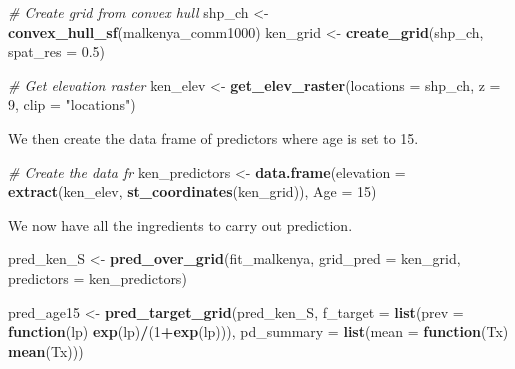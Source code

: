 \documentclass[
  letterpaper,
]{krantz}
\newenvironment{Shaded}{\begin{snugshade}}{\end{snugshade}}
\newcommand{\AttributeTok}[1]{\textcolor[rgb]{0.13,0.29,0.53}{#1}}
\newcommand{\CommentTok}[1]{\textcolor[rgb]{0.56,0.35,0.01}{\textit{#1}}}
\newcommand{\ControlFlowTok}[1]{\textcolor[rgb]{0.13,0.29,0.53}{\textbf{#1}}}
\newcommand{\DecValTok}[1]{\textcolor[rgb]{0.00,0.00,0.81}{#1}}
\newcommand{\FloatTok}[1]{\textcolor[rgb]{0.00,0.00,0.81}{#1}}
\newcommand{\FunctionTok}[1]{\textcolor[rgb]{0.13,0.29,0.53}{\textbf{#1}}}
\newcommand{\NormalTok}[1]{#1}
\newcommand{\OtherTok}[1]{\textcolor[rgb]{0.56,0.35,0.01}{#1}}
\newcommand{\SpecialCharTok}[1]{\textcolor[rgb]{0.81,0.36,0.00}{\textbf{#1}}}
\newcommand{\StringTok}[1]{\textcolor[rgb]{0.31,0.60,0.02}{#1}}
\begin{document}
\begin{Shaded}
\begin{Highlighting}[]
\CommentTok{\# Create grid from convex hull}
\NormalTok{shp\_ch }\OtherTok{\textless{}{-}} \FunctionTok{convex\_hull\_sf}\NormalTok{(malkenya\_comm1000)}
\NormalTok{ken\_grid }\OtherTok{\textless{}{-}} \FunctionTok{create\_grid}\NormalTok{(shp\_ch, }\AttributeTok{spat\_res =} \FloatTok{0.5}\NormalTok{)}

\CommentTok{\# Get elevation raster}
\NormalTok{ken\_elev }\OtherTok{\textless{}{-}} 
\FunctionTok{get\_elev\_raster}\NormalTok{(}\AttributeTok{locations =}\NormalTok{ shp\_ch, }
                \AttributeTok{z =} \DecValTok{9}\NormalTok{, }\AttributeTok{clip =} \StringTok{"locations"}\NormalTok{)}
\end{Highlighting}
\end{Shaded}

We then create the data frame of predictors where age is set to 15.

\begin{Shaded}
\begin{Highlighting}[]
\CommentTok{\# Create the data fr}
\NormalTok{ken\_predictors }\OtherTok{\textless{}{-}} \FunctionTok{data.frame}\NormalTok{(}\AttributeTok{elevation =} 
                           \FunctionTok{extract}\NormalTok{(ken\_elev, }\FunctionTok{st\_coordinates}\NormalTok{(ken\_grid)),}
                         \AttributeTok{Age =} \DecValTok{15}\NormalTok{)}
\end{Highlighting}
\end{Shaded}

We now have all the ingredients to carry out prediction.

\begin{Shaded}
\begin{Highlighting}[]
\NormalTok{pred\_ken\_S }\OtherTok{\textless{}{-}} \FunctionTok{pred\_over\_grid}\NormalTok{(fit\_malkenya, }\AttributeTok{grid\_pred =}\NormalTok{ ken\_grid,}
                             \AttributeTok{predictors =}\NormalTok{ ken\_predictors)}

\NormalTok{pred\_age15 }\OtherTok{\textless{}{-}} 
\FunctionTok{pred\_target\_grid}\NormalTok{(pred\_ken\_S, }
                 \AttributeTok{f\_target =} \FunctionTok{list}\NormalTok{(}\AttributeTok{prev =} \ControlFlowTok{function}\NormalTok{(lp) }\FunctionTok{exp}\NormalTok{(lp)}\SpecialCharTok{/}\NormalTok{(}\DecValTok{1}\SpecialCharTok{+}\FunctionTok{exp}\NormalTok{(lp))),}
                 \AttributeTok{pd\_summary =} \FunctionTok{list}\NormalTok{(}\AttributeTok{mean =} \ControlFlowTok{function}\NormalTok{(Tx) }\FunctionTok{mean}\NormalTok{(Tx)))}
\end{Highlighting}
\end{Shaded}
\end{document}
